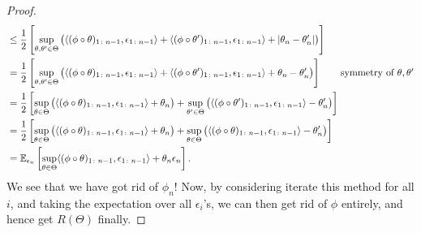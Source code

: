\begin{proof}
\begin{align*}
		 & \leq \frac{1}{2} \left[
			\sup _{\theta , \theta ^{\prime} \in \Theta } \big( \langle (\phi \circ \theta )_{1 \colon n-1}, \epsilon _{1 \colon n-1} \rangle
			+ \langle (\phi \circ \theta ^{\prime} )_{1\colon n-1} , \epsilon _{1 \colon n-1} \rangle + \vert \theta _n - \theta _n^{\prime} \vert \big)
		\right]                                                                                                                                                                        \\
		 & = \frac{1}{2} \left[
			\sup _{\theta , \theta ^{\prime} \in \Theta } \big( \langle (\phi \circ \theta )_{1 \colon n-1}, \epsilon _{1 \colon n-1} \rangle
			+ \langle (\phi \circ \theta ^{\prime} )_{1\colon n-1} , \epsilon _{1 \colon n-1} \rangle + \theta _n - \theta _n^{\prime} \big)
		\right] \tag*{symmetry of \(\theta , \theta ^{\prime} \)}                                                                                                                      \\
		 & = \frac{1}{2} \left[
			\sup _{\theta \in \Theta } \big( \langle (\phi \circ \theta )_{1 \colon n-1}, \epsilon _{1 \colon n-1} \rangle + \theta _n \big)
			+ \sup _{\theta ^{\prime} \in \Theta } \big( \langle (\phi \circ \theta ^{\prime} )_{1\colon n-1} , \epsilon _{1 \colon n-1} \rangle - \theta _n^{\prime} \big)
		\right]                                                                                                                                                                        \\
		 & = \frac{1}{2} \left[
			\sup _{\theta \in \Theta } \big( \langle (\phi \circ \theta )_{1 \colon n-1}, \epsilon _{1 \colon n-1} \rangle + \theta _n \big)
			+ \sup _{\theta \in \Theta } \big( \langle (\phi \circ \theta )_{1\colon n-1} , \epsilon _{1 \colon n-1} \rangle - \theta _n^{\prime} \big)
		\right]                                                                                                                                                                        \\
		 & = \mathbb{E}_{\epsilon _n}\left[ \sup _{\theta \in \Theta } \langle (\phi \circ \theta )_{1 \colon n-1} , \epsilon _{1 \colon n-1} \rangle + \theta _n \epsilon _n \right].
	\end{align*}
	We see that we have got rid of \(\phi _n\)! Now, by considering iterate this method for all \(i\), and taking the expectation over all \(\epsilon _i\)'s, we can then get rid of \(\phi \) entirely, and hence get \(R(\Theta )\) finally.
\end{proof}

